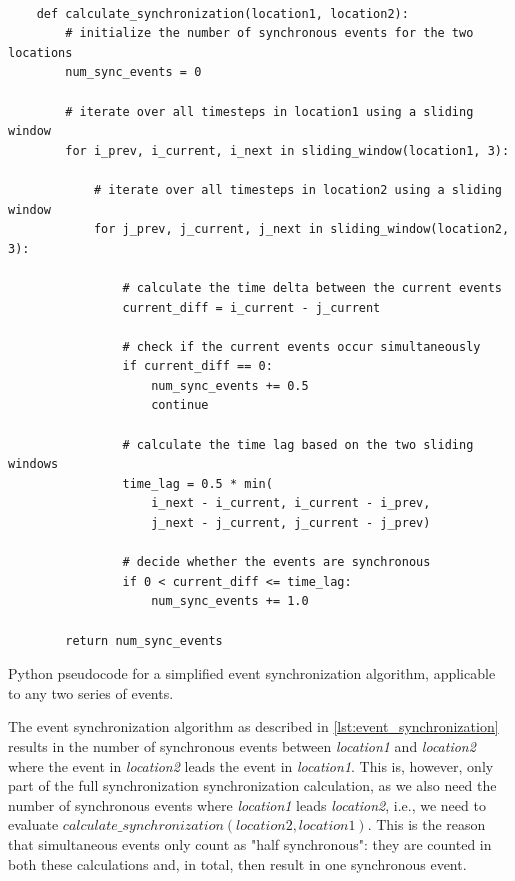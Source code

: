 \begin{listing}[H]
  \begin{verbatim}

    def calculate_synchronization(location1, location2):
        # initialize the number of synchronous events for the two locations
        num_sync_events = 0

        # iterate over all timesteps in location1 using a sliding window
        for i_prev, i_current, i_next in sliding_window(location1, 3):

            # iterate over all timesteps in location2 using a sliding window
            for j_prev, j_current, j_next in sliding_window(location2, 3):

                # calculate the time delta between the current events
                current_diff = i_current - j_current

                # check if the current events occur simultaneously
                if current_diff == 0:
                    num_sync_events += 0.5
                    continue

                # calculate the time lag based on the two sliding windows
                time_lag = 0.5 * min(
                    i_next - i_current, i_current - i_prev,
                    j_next - j_current, j_current - j_prev)

                # decide whether the events are synchronous
                if 0 < current_diff <= time_lag:
                    num_sync_events += 1.0

        return num_sync_events

  \end{verbatim}
  \caption{Python pseudocode for a simplified event synchronization algorithm, applicable to any two series of events.}
  \label{lst:event_synchronization}
\end{listing}

The event synchronization algorithm as described in \cref{lst:event_synchronization} results in the number of synchronous events between \textit{location1} and \textit{location2} where the event in \textit{location2} leads the event in \textit{location1}. This is, however, only part of the full synchronization synchronization calculation, as we also need the number of synchronous events where \textit{location1} leads \textit{location2}, i.e., we need to evaluate $calculate\_synchronization(location2, location1)$. This is the reason that simultaneous events only count as "half synchronous": they are counted in both these calculations and, in total, then result in one synchronous event.

